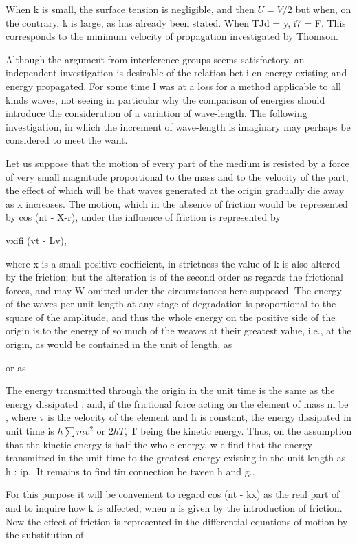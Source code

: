 When k is small, the surface tension is negligible, and then \(U=V/2\)
but when, on the contrary, k is large, as has already been
stated. When TJd = y, i7 = F. This corresponds to the minimum
velocity of propagation investigated by Thomson.


Although the argument from interference groups seems satisfactory,
an independent investigation is desirable of the relation bet i en
energy existing and energy propagated. For some time I was at a loss
for a method applicable to all kinds waves, not seeing in particular
why the comparison of energies should introduce the consideration of
a variation of wave-length. The following investigation, in which the
increment of wave-length is imaginary may perhaps be considered to
meet the want.

Let us suppose that the motion of every part of the medium is
resisted by a force of very small magnitude proportional to the mass
and to the velocity of the part, the effect of which will be that waves
generated at the origin gradually die away as x increases. The motion,
which in the absence of friction would be represented by cos (nt - X-r),
under the influence of friction is represented by

vxifi (vt - Lv),

where x is a small positive coefficient, in strictness the value of k is
also altered by the friction; but the alteration is of the second order as
regards the frictional forces, and may W omitted under the circumstances here
supposed. The energy of the waves per unit length at
any stage of degradation is proportional to the square of the amplitude,
and thus the whole energy on the positive side of the origin is to the
energy of so much of the weaves at their greatest value, i.e., at the
origin, as would be contained in the unit of length, as

or as

The energy transmitted through the origin in the
unit time is the same as the energy dissipated ; and, if the frictional
force acting on the element of mass m be
, where v is the velocity
of the element and h is constant, the energy dissipated in unit time is
\( h \sum m v^2\)
or
\(2 h T\), T being the kinetic energy. Thus, on the assumption
that the kinetic energy is half the whole energy, w e find that the
energy transmitted in the unit time to the greatest energy existing
in the unit length as h : ip.. It remains to find tin connection be
tween h and g..

For this purpose it will be convenient to regard cos (nt - kx) as the
real part of and to inquire how k is affected, when n is given
by the introduction of friction. Now the effect of friction is represented in
the differential equations of motion by the substitution of


